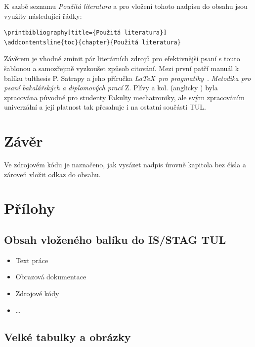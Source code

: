 \documentclass[FZS,DP,EN]{tulthesis}
\newcommand{\argument}[1]{{\ttfamily\color{\tulcolor}#1}}
\newenvironment{myquote}{\begin{list}{}{\setlength\leftmargin\parindent}\item[]}{\end{list}}
\newenvironment{listing}{\begin{myquote}\color{\tulcolor}}{\end{myquote}}
\begin{document}
K sazbě seznamu \textit{Použitá literatura} a pro vložení tohoto nadpisu do obsahu jsou využity následující řádky:
\begin{listing}
\begin{verbatim}
\printbibliography[title={Použitá literatura}] 
\addcontentsline{toc}{chapter}{Použitá literatura}     
\end{verbatim}
\end{listing}

Závěrem je vhodné zmínit pár literárních zdrojů pro efektivnější psaní s touto šablonou a samozřejmě vyzkoušet způsob citování. Mezi první patří manuál k balíku \argument{tulthesis} P. Satrapy \cite{Satrapa2022tulthesis} a jeho příručka \textit{\LaTeX\  pro pragmatiky}~\cite{Satrapa2023LatexPragmatiky}. \textit{Metodika pro psaní bakalářských a diplomových prací} Z. Plívy a kol. \cite{Pliva2023DOKcz} (anglicky \cite{Pliva2024DOKen}) byla zpracována původně pro studenty Fakulty mechatroniky, ale svým zpracováním univerzální a její platnost tak přesahuje i na ostatní součásti TUL. 

\chapter*{Závěr}

Ve zdrojovém kódu je naznačeno, jak vysázet nadpis úrovně kapitola bez čísla a zároveň vložit odkaz do obsahu. \cite{12331}

\printbibliography[title={Použitá literatura},heading=bibintoc] %



\renewcommand{\indexname}{Přehled příkazů, prostředí a voleb}
\printindex

\appendix %
\chapter{Přílohy}
\section{Obsah vloženého balíku do IS/STAG TUL} %
\begin{itemize}
    \item Text práce
    \item Obrazová dokumentace
    \item Zdrojové kódy
    \item \dots
\end{itemize}

\section{Velké tabulky a obrázky} %
\end{document}
